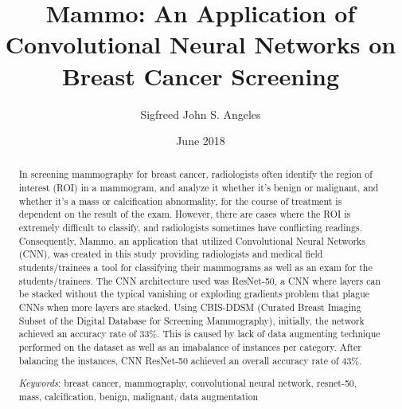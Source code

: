 \documentclass[11pt,a4paper,titlepage]{article}
\title {Mammo: An Application of Convolutional Neural Networks on Breast Cancer Screening}
\author {Sigfreed John S. Angeles}
\date{June 2018}
\newcommand{\Keywords}[1]{\par\noindent 
{\small{\em Keywords\/}: #1}}
\newcommand{\+}{\discretionary{\mbox{${\bm\cdot}\mkern-1mu$}}{}{}}
\begin{document}


\acceptancesheet

\doublespacing

\begin{abstract}
\thispagestyle{plain}
\setcounter{page}{2}
	\qquad In screening mammography for breast cancer, radiologists often identify the region of interest (ROI) in a mammogram, and analyze it whether it's benign or malignant, and whether it's a mass or calcification abnormality, for the course of treatment is dependent on the result of the exam. However, there are cases where the ROI is extremely difficult to classify, and radiologists sometimes have conflicting readings. Consequently, Mammo, an application that utilized Convolutional Neural Networks (CNN), was created in this study providing radiologists and medical field students/trainees a tool for classifying their mammograms as well as an exam for the students/trainees. The CNN architecture used was ResNet-50, a CNN where layers can be stacked without the typical vanishing or exploding gradients problem that plague CNNs when more layers are stacked. Using CBIS-DDSM (Curated Breast Imaging Subset of the Digital Database for Screening Mammography), initially, the network achieved an accuracy rate of 33\%. This is caused by lack of data augmenting technique performed on the dataset as well as an imabalance of instances per category. After balancing the instances, CNN ResNet-50 achieved an overall accuracy rate of 43\%.
\Keywords{breast cancer, mammography, convolutional neural network, resnet-50, mass, calcification, benign, malignant, data augmentation}
\end{abstract}

\setcounter{page}{3}
\setcounter{tocdepth}{3}
\newpage
\tableofcontents
\newpage
\listoffigures

\doublespacing










\newpage



\end{document}
